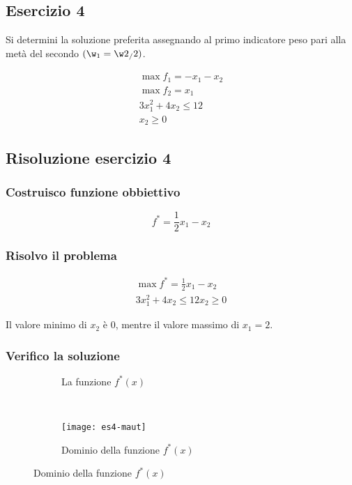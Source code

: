 \documentclass[\main/main.tex]{subfiles}
\begin{document}
\subsection{Esercizio 4}
Si determini la soluzione preferita assegnando al primo indicatore peso pari alla metà del secondo $(\w_1 = \w2_/2)$.

\begin{align*}
  \max f_1 = -x_1 -x_2  \\
  \max f_2 = x_1        \\
  3x_1^2 + 4x_2 \leq 12 \\
  x_2 \geq 0
\end{align*}

\subsection{Risoluzione esercizio 4}

\subsubsection*{Costruisco funzione obbiettivo}
\[
  f^* = \frac{1}{2}x_1 - x_2
\]

\subsubsection*{Risolvo il problema}

\begin{align*}
  \max f^* = \frac{1}{2}x_1 - x_2 \\
  3x_1^2 + 4x_2 \leq 12
  x_2 \geq 0
\end{align*}

Il valore minimo di $x_2$ è $0$, mentre il valore massimo di $x_1 = 2$.

\subsubsection*{Verifico la soluzione}

\begin{figure}
  \begin{subfigure}{0.45\textwidth}
    \caption{La funzione $f^*(x)$}
  \end{subfigure}
  ~
  \begin{subfigure}{0.45\textwidth}
    \texttt{[image: es4-maut]}
    \caption{Dominio della funzione $f^*(x)$}
  \end{subfigure}
\end{figure}
\end{document}
